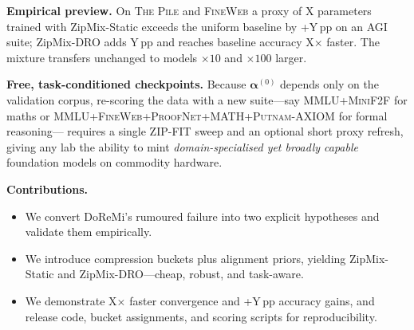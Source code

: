 \medskip
\textbf{Empirical preview.} On \textsc{The Pile} and \textsc{FineWeb} a proxy of X parameters trained with ZipMix-Static exceeds the uniform baseline by +Y\,pp on an AGI suite; ZipMix-DRO adds Y\,pp and reaches baseline accuracy X× faster.
The mixture transfers unchanged to models $\times10$ and $\times100$ larger.

\medskip
\textbf{Free, task-conditioned checkpoints.} Because $\boldsymbol{\alpha}^{(0)}$ depends only on the validation corpus, re-scoring the data with a new suite—say \textsc{MMLU+MiniF2F} for maths or \textsc{MMLU+FineWeb+ProofNet+MATH+Putnam-AXIOM} for formal reasoning— requires a single ZIP-FIT sweep and an optional short proxy refresh, giving any lab the ability to mint \emph{domain-specialised yet broadly capable} foundation models on commodity hardware.

\medskip
\textbf{Contributions.}
\begin{itemize}[leftmargin=1.15em,topsep=0pt,itemsep=0pt]
\item We convert DoReMi's rumoured failure into two explicit hypotheses and validate them empirically.
\item We introduce compression buckets plus alignment priors, yielding ZipMix-Static and ZipMix-DRO—cheap, robust, and task-aware.
\item We demonstrate X× faster convergence and +Y\,pp accuracy gains, and release code, bucket assignments, and scoring scripts for reproducibility.
\end{itemize}


